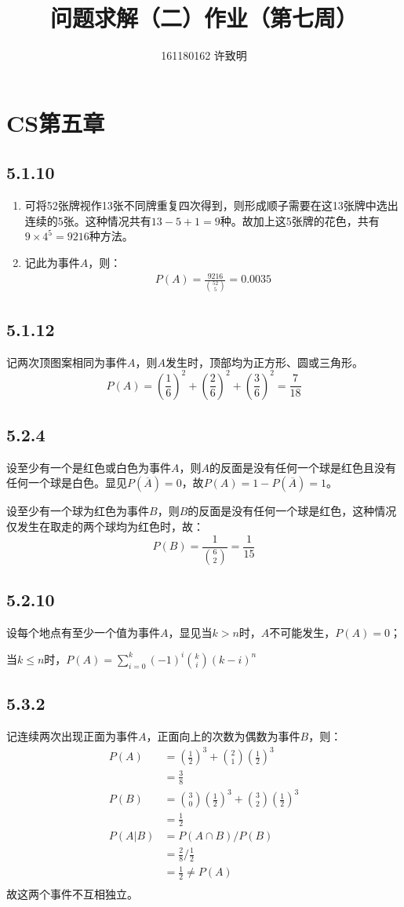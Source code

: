 \documentclass[twocolumn]{article}
\begin{document}
	\title{问题求解（二）作业（第七周）}\author{161180162 许致明}\maketitle
	\section*{CS第五章}
	\subsection*{5.1.10}
	\begin{enumerate}[(1)]
		\item 可将52张牌视作13张不同牌重复四次得到，则形成顺子需要在这13张牌中选出连续的5张。这种情况共有$13-5+1=9$种。故加上这5张牌的花色，共有$9\times 4^5=9216$种方法。
		\item 记此为事件$A$，则：
		\[
		\begin{aligned}
		P(A)=\frac{9216}{\binom{52}{5}}=0.0035
		\end{aligned}
		\]
	\end{enumerate}
	\subsection*{5.1.12}
	记两次顶图案相同为事件$A$，则$A$发生时，顶部均为正方形、圆或三角形。
	\[
	P(A)=\left(\frac{1}{6}\right)^2+\left(\frac{2}{6}\right)^2+\left(\frac{3}{6}\right)^2=\frac{7}{18}
	\]
	\subsection*{5.2.4}
	设至少有一个是红色或白色为事件$A$，则$A$的反面是没有任何一个球是红色且没有任何一个球是白色。显见$P(\overline{A})=0$，故$P(A)=1-P(\overline{A})=1$。\par 
	设至少有一个球为红色为事件$B$，则$B$的反面是没有任何一个球是红色，这种情况仅发生在取走的两个球均为红色时，故：
	\[
	P(B)=\frac{1}{\binom{6}{2}}=\frac{1}{15}
	\]
	\subsection*{5.2.10}
	设每个地点有至少一个值为事件$A$，显见当$k>n$时，$A$不可能发生，$P(A)=0$；\par 
	当$k\le n$时，$P(A)=\sum_{i=0}^{k}(-1)^i\binom{k}{i}(k-i)^n$
	\subsection*{5.3.2}
	记连续两次出现正面为事件$A$，正面向上的次数为偶数为事件$B$，则：
	\[
	\begin{aligned}
		P(A)&=\left(\frac{1}{2}\right)^3+\binom{2}{1}\left(\frac{1}{2}\right)^3\\
		&=\frac{3}{8}\\
		P(B)&=\binom{3}{0}\left(\frac{1}{2}\right)^3+\binom{3}{2}\left(\frac{1}{2}\right)^3\\
		&=\frac{1}{2}\\
		P(A|B)&=P(A\cap B)/P(B)\\
		&=\frac{2}{8}/\frac{1}{2}\\
		&=\frac{1}{2}\neq P(A)\\
	\end{aligned}
	\]
	故{这两个事件不互相独立。}
\end{document}

